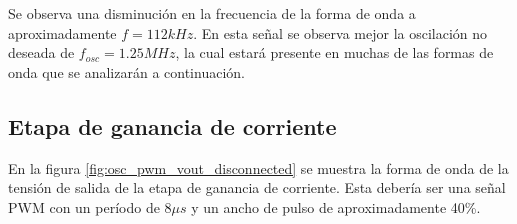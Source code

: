 Se observa una disminución en la frecuencia de la forma de onda a aproximadamente $f=112kHz$. 
En esta señal se observa mejor la oscilación no deseada de $f_{osc}=1.25MHz$, 
la cual estará presente en muchas de las formas de onda que se analizarán a continuación. 






\subsection{Etapa de ganancia de corriente}





En la figura \ref{fig:osc_pwm_vout_disconnected} se muestra la forma de onda de la tensión de salida de la etapa de ganancia de corriente.
Esta debería ser una señal PWM con un período de $8\mu s$ y un ancho de pulso de aproximadamente 40\%.

